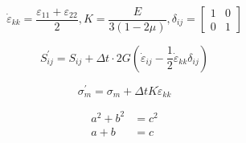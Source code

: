\documentclass[fontset=windows]{ctexart}
\begin{document}
\begin{center}
	\begin{equation}
		\dot{\varepsilon}_{kk} = \frac{\varepsilon_{11}+\varepsilon_{22}}{2} , K = \frac{E}{3(1-2\mu)},\delta_{ij} = {
				\left[\begin{array}{cc}
						1 & 0 \\
						0 & 1
					\end{array}
					\right ]}\nonumber
	\end{equation}

	\begin{equation}
		S_{ij}^{'} = S_{ij} + \Delta t \cdot 2G(\dot{\varepsilon}_{ij}-\frac{1}{2}\dot{\varepsilon}_{kk}\delta_{ij}) \nonumber
	\end{equation}

	\begin{equation}
		\sigma_{m}^{'} = \sigma_{m} + \Delta t K \dot{\varepsilon}_{kk} \nonumber
	\end{equation}
\end{center}

\begin{align}
	a^2+b^2 & = c^2 \\
	a+b     & = c
\end{align}
\end{document}
